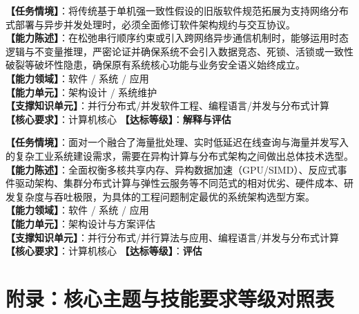 \clearpage
\begin{strip}
\noindent\begin{minipage}[t]{\columnwidth}
\begin{taskbox}[任务 3：在保障系统关键语义与正确性前提下修订规约以支持分布式扩展]
\textbf{【任务情境】}：将传统基于单机强一致性假设的旧版软件规范拓展为支持网络分布式部署与异步并发处理时，必须全面修订软件架构规约与交互协议。\\
\textbf{【能力陈述】}：在松弛串行顺序约束或引入跨网络异步通信机制时，能够运用时态逻辑与不变量推理，严密论证并确保系统不会引入数据竞态、死锁、活锁或一致性破裂等破坏性隐患，确保原有系统核心功能与业务安全语义始终成立。\\
\textbf{【能力领域】}：软件 / 系统 / 应用\\
\textbf{【能力单元】}：架构设计 / 系统维护\\
\textbf{【支撑知识单元】}：并行分布式/并发软件工程、编程语言/并发与分布式计算\\
\textbf{【核心要求】}：计算机核心 \quad \textbf{【达标等级】}：\textbf{解释与评估}
\end{taskbox}
\end{minipage}\hfill
\begin{minipage}[t]{\columnwidth}
\begin{taskbox}[任务 4：针对复杂工程需求在多种并行与分布式架构方案间进行评估与选型]
\textbf{【任务情境】}：面对一个融合了海量批处理、实时低延迟在线查询与海量并发写入的复杂工业系统建设需求，需要在异构计算与分布式架构之间做出总体技术选型。\\
\textbf{【能力陈述】}：全面权衡多核共享内存、异构数据加速（GPU/SIMD）、反应式事件驱动架构、集群分布式计算与弹性云服务等不同范式的相对优劣、硬件成本、研发复杂度与吞吐极限，为具体的工程问题制定最优的系统架构选型方案。\\
\textbf{【能力领域】}：软件 / 系统 / 应用\\
\textbf{【能力单元】}：架构设计与方案评估\\
\textbf{【支撑知识单元】}：并行分布式/并行算法与应用、编程语言/并发与分布式计算\\
\textbf{【核心要求】}：计算机核心 \quad \textbf{【达标等级】}：\textbf{评估}
\end{taskbox}
\end{minipage}

\section{附录：核心主题与技能要求等级对照表}


\end{strip}

